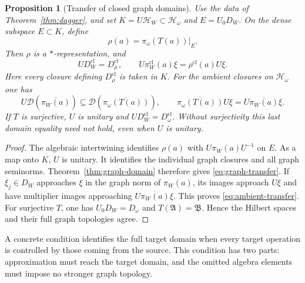 \documentclass[11pt]{article}
\newtheorem{proposition}[theorem]{Proposition}
\theoremstyle{definition}
\theoremstyle{remark}
\numberwithin{equation}{section}
\begin{document}
\begin{proposition}[Transfer of closed graph domains]
\label{prop:graph-transfer}
Use the data of Theorem~\ref{thm:dagger}, and set
$K=U\mathcal H_W\subset\mathcal H_\omega$ and $E=U_0D_W$.
On the dense subspace $E\subset K$, define
\[
 \rho(a)=\pi_\omega(T(a))|_E.
\]
Then $\rho$ is a $*$-representation, and
\begin{equation}
 U D_W^{\mathrm{cl}}=D_\rho^{\mathrm{cl}},
 \qquad
 U\pi_W^{\mathrm{cl}}(a)\xi=\rho^{\mathrm{cl}}(a)U\xi.
 \label{eq:graph-transfer}
\end{equation}
Here every closure defining $D_\rho^{\mathrm{cl}}$ is taken in $K$.
For the ambient closures on $\mathcal H_\omega$ one has
\begin{equation}
 U\mathcal D(\overline{\pi_W(a)})
 \subseteq\mathcal D(\overline{\pi_\omega(T(a))}),
 \qquad
 \overline{\pi_\omega(T(a))}U\xi
 =U\overline{\pi_W(a)}\xi.
 \label{eq:ambient-transfer}
\end{equation}
If $T$ is surjective, $U$ is unitary and
$U D_W^{\mathrm{cl}}=D_\omega^{\mathrm{cl}}$.
Without surjectivity this last domain equality need not hold,
even when $U$ is unitary.
\end{proposition}

\begin{proof}
The algebraic intertwining identifies $\rho(a)$ with
$U\pi_W(a)U^{-1}$ on $E$.  As a map onto $K$, $U$ is unitary.
It identifies the individual graph closures and all graph seminorms.
Theorem~\ref{thm:graph-domain} therefore gives \eqref{eq:graph-transfer}.
If $\xi_j\in D_W$ approaches $\xi$ in the graph norm of
$\pi_W(a)$, its images approach $U\xi$ and have multiplier images
approaching $U\overline{\pi_W(a)}\xi$.
This proves \eqref{eq:ambient-transfer}.
For surjective $T$, one has $U_0D_W=D_\omega$ and $T(\mathfrak A)=\mathfrak B$.
Hence the Hilbert spaces and their full graph topologies agree.
\end{proof}

A concrete condition identifies the full target domain when every target
operation is controlled by those coming from the source.  This condition
has two parts: approximation must reach the target domain, and the omitted
algebra elements must impose no stronger graph topology.
\end{document}
